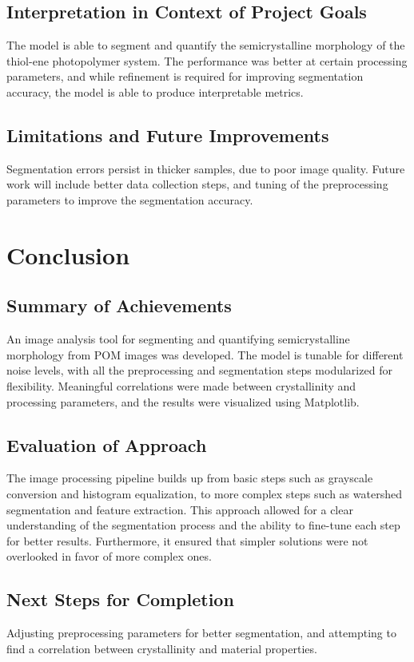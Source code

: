 \documentclass[12pt]{article}
\begin{document}
\subsection{Interpretation in Context of Project Goals}
The model is able to segment and quantify the semicrystalline morphology of the thiol-ene photopolymer system.
The performance was better at certain processing parameters, and while refinement is required for improving
segmentation accuracy, the model is able to produce interpretable metrics.

\subsection{Limitations and Future Improvements}
Segmentation errors persist in thicker samples, due to poor image quality. Future work will include 
better data collection steps, and tuning of the preprocessing parameters to improve the segmentation accuracy.

\section{Conclusion}

\subsection{Summary of Achievements}
An image analysis tool for segmenting and quantifying semicrystalline morphology from POM images was developed.
The model is tunable for different noise levels, with all the preprocessing and segmentation steps modularized for flexibility.
Meaningful correlations were made between crystallinity and processing parameters, and the results were visualized using Matplotlib.

\subsection{Evaluation of Approach}
The image processing pipeline builds up from basic steps such as grayscale conversion and histogram equalization, 
to more complex steps such as watershed segmentation and feature extraction. This approach allowed for a clear understanding
of the segmentation process and the ability to fine-tune each step for better results. Furthermore, it ensured that simpler 
solutions were not overlooked in favor of more complex ones.

\subsection{Next Steps for Completion}
Adjusting preprocessing parameters for better segmentation, and attempting to find a correlation between crystallinity and
 material properties.
\end{document}
